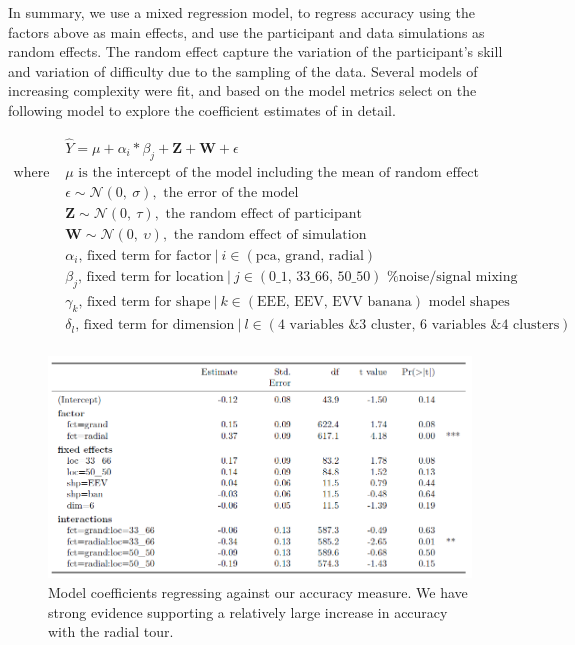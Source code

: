 \documentclass[
  11,
]{article}
\begin{document}
In summary, we use a mixed regression model, to regress accuracy using the factors above as main effects, and use the participant and data simulations as random effects. The random effect capture the variation of the participant's skill and variation of difficulty due to the sampling of the data. Several models of increasing complexity were fit, and based on the model metrics select on the following model to explore the coefficient estimates of in detail.

\[
\begin{array}{ll}
&\widehat{Y} = \mu + \alpha_i * \beta_j + \textbf{Z} + \textbf{W} + \epsilon \\
\text{where } &\mu \text{ is the intercept of the model including the mean of random effect} \\
&\epsilon   \sim \mathcal{N}(0,~\sigma), \text{ the error of the model} \\
&\textbf{Z} \sim \mathcal{N}(0,~\tau), \text{ the random effect of participant} \\
&\textbf{W} \sim \mathcal{N}(0,~\upsilon), \text{ the random effect of simulation} \\
&\alpha_i \text{, fixed term for factor}~|~i\in (\text{pca, grand, radial}) \\
&\beta_j  \text{, fixed term for location}~|~j\in (\text{0\_1, 33\_66, 50\_50}) \text{ \% noise/signal mixing} \\
&\gamma_k \text{, fixed term for shape}~|~k\in (\text{EEE, EEV, EVV banana}) \text{ model shapes} \\
&\delta_l \text{, fixed term for dimension}~|~l\in (\text{4 variables \& 3 cluster, 6 variables \& 4 clusters}) \\
\end{array}
\]

\begin{figure}

{\centering \includegraphics[width=1\linewidth,]{figures/spinifex_study_y1_results} 

}

\caption{Model coefficients regressing against our accuracy measure. We have strong evidence supporting a relatively large increase in accuracy with the radial tour.}\label{fig:studyResults}
\end{figure}
\end{document}
